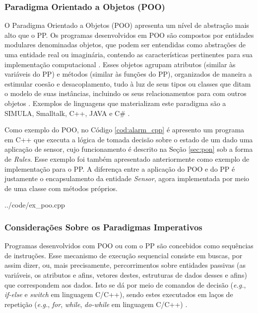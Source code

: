 \subsubsection{Paradigma Orientado a Objetos (POO)}

O Paradigma Orientado a Objetos (POO) apresenta um nível de abstração mais alto
que o PP. Os programas desenvolvidos em POO são compostos por entidades
modulares denominadas objetos, que podem ser entendidas como abstrações de uma
entidade real ou imaginária, contendo as características pertinentes para sua implementação
computacional \cite{poo_2007}. Esses objetos agrupam atributos (similar às
variáveis do PP) e métodos (similar às funções do PP), organizados de maneira a
estimular coesão e desacoplamento, tudo à luz de seus tipos ou classes que ditam
o modelo de suas instâncias, incluindo os seus relacionamentos para com outros
objetos \cite{watt_2004,brookshear_2006,pressman_2016,msc_santos_2017}. Exemplos
de linguagens que materializam este paradigma são a SIMULA, Smalltalk, C++, JAVA
e C\# \cite{msc_Banaszewski_2009}.

Como exemplo do POO, no Código \ref{cod:alarm_cpp} é apresento um programa em
C++ que executa a lógica de tomada decisão sobre o estado de um dado uma
aplicação de sensor, cujo funcionamento é descrito na Seção \ref{sec:pon} sob a
forma de \textit{Rules}. Esse exemplo foi também apresentado anteriormente como
exemplo de implementação para o PP. A diferença entre a aplicação do POO e do PP
é justamente o encapsulamento da entidade \textit{Sensor}, agora implementada
por meio de uma classe com métodos próprios.


{../code/ex_poo.cpp}

\subsubsection{Considerações Sobre os Paradigmas Imperativos}

Programas desenvolvidos com POO ou com o PP são concebidos como sequências de
instruções. Esse mecanismo de execução sequencial consiste em buscas, por assim
dizer, ou, mais precisamente, percorrimentos sobre entidades passivas (as
variáveis, os atributos e afins, vetores destes, estruturas de dados desses e
afins) que correspondem aos dados. Isto se dá por meio de comandos de decisão
(\textit{e.g.}, \textit{if-else} e \textit{switch} em linguagem C/C++), sendo
estes executados em laços de repetição (\textit{e.g.}, \textit{for},
\textit{while}, \textit{do-while} em linguagem C/C++) \cite{msc_santos_2017}.

